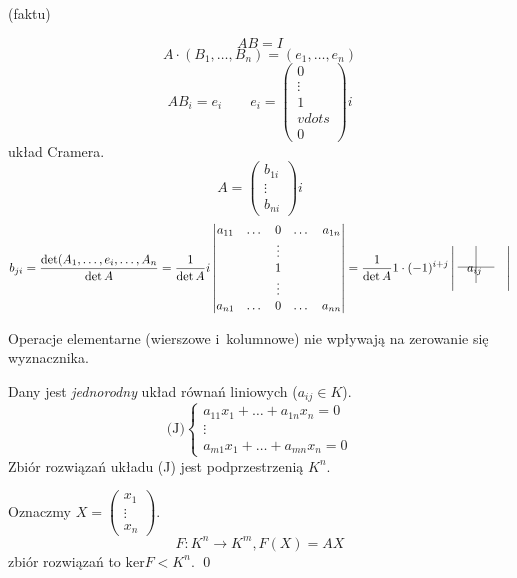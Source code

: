 \begin{dd}
  (faktu)

  \[AB=I\]
  \[A\cdot(B_1, \dots, B_n)=(e_1, \dots, e_n)\]
  \[AB_i=e_i \qquad e_i = \begin{pmatrix} 0 \\ \vdots \\ 1 \\vdots \\ 0\end{pmatrix} i\]
  układ Cramera.
  \[A = \begin{pmatrix}b_{1i}\\\vdots\\b_{ni}\end{pmatrix} i\]
    \[b_{ji}=\frac{\det(A_1,\dots,e_i,\dots,A_n}{\det A}=\frac1{\det A}i
    \begin{vmatrix}
      a_{11}&\dots&0&\dots&a_{1n}\\
      &&\vdots&&\\
      &&1&&\\
      &&\vdots&&\\
      a_{n1}&\dots&0&\dots&a_{nn}
    \end{vmatrix} = \frac1{\det A}1\cdot(-1)^{i+j}
    \begin{vmatrix}
  & & & \\ 
  & a_{ij} \makebox(-10,0){\rule[4mm]{0.4pt}{2.5\normalbaselineskip}} 
      \makebox(-10,0){\rule[2.5mm]{2.5\normalbaselineskip}{0.4pt}} 
  & \\ 
  & & &
  \end{vmatrix}
    \]
\end{dd}
\begin{uw}
  Operacje elementarne (wierszowe i~kolumnowe) nie wpływają na zerowanie się
  wyznacznika.
\end{uw}
\begin{ft}
  Dany jest \textit{jednorodny} układ równań liniowych ($a_{ij} \in K$).
  \[\text{(J)}\left\{\begin{array}{l}
      a_{11}x_1+\dots+a_{1n}x_n = 0
      \\\vdots\\
      a_{m1}x_1+\dots+a_{mn}x_n = 0
    \end{array}\right.\]
  Zbiór rozwiązań układu (J) jest podprzestrzenią $K^n$.
\end{ft}
\begin{dd}
  Oznaczmy $X = \begin{pmatrix}x_1\\\vdots\\x_n\end{pmatrix}$.
  \[F: K^n \rightarrow K^m, F(X)=AX\]
  zbiór rozwiązań to $\mathrm{ker}F < K^n$.
  \hfill \qed
\end{dd}
